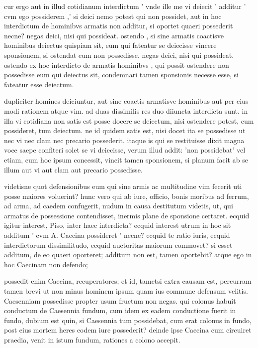  cur ergo aut in illud cotidianum interdictum ' vnde ille me vi deiecit ' additur ' cvm ego possiderem ,' si deici nemo potest qui non possidet, aut in hoc interdictum de hominibvs armatis non additur, si oportet quaeri possederit necne? negas deici, nisi qui possideat. ostendo , si sine armatis coactisve hominibus deiectus quispiam sit, eum qui fateatur se deiecisse vincere sponsionem, si ostendat eum non possedisse. negas deici, nisi qui possideat. ostendo ex hoc interdicto de armatis hominibvs , qui possit ostendere non possedisse eum qui deiectus sit, condemnari tamen sponsionis necesse esse, si fateatur esse deiectum.

 dupliciter homines deiciuntur, aut sine coactis armatisve hominibus aut per eius modi rationem atque vim. ad duas dissimilis res duo diiuncta interdicta sunt. in illa vi cotidiana non satis est posse docere se deiectum, nisi ostendere potest, cum possideret, tum deiectum. ne id quidem satis est, nisi docet ita se possedisse ut nec vi nec clam nec precario possederit. itaque is qui se restituisse dixit magna voce saepe confiteri solet se vi deiecisse, verum illud addit: 'non possidebat' vel etiam, cum hoc ipsum concessit, vincit tamen sponsionem, si planum facit ab se illum aut vi aut clam aut precario possedisse.

 videtisne quot defensionibus eum qui sine armis ac multitudine vim fecerit uti posse maiores voluerint? hunc vero qui ab iure, officio, bonis moribus ad ferrum, ad arma, ad caedem confugerit, nudum in causa destitutum videtis, ut, qui armatus de possessione contendisset, inermis plane de sponsione certaret. ecquid igitur interest, Piso, inter haec interdicta? ecquid interest utrum in hoc sit additum ' cvm A. Caecina possideret ' necne? ecquid te ratio iuris, ecquid interdictorum dissimilitudo, ecquid auctoritas maiorum commovet? si esset additum, de eo quaeri oporteret; additum non est, tamen oportebit? atque ego in hoc Caecinam non defendo;

 possedit enim Caecina, recuperatores; et id, tametsi extra causam est, percurram tamen brevi ut non minus hominem ipsum quam ius commune defensum velitis. Caesenniam possedisse propter usum fructum non negas. qui colonus habuit conductum de Caesennia fundum, cum idem ex eadem conductione fuerit in fundo, dubium est quin, si Caesennia tum possidebat, cum erat colonus in fundo, post eius mortem heres eodem iure possederit? deinde ipse Caecina cum circuiret praedia, venit in istum fundum, rationes a colono accepit.

